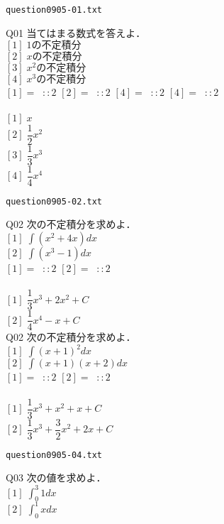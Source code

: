 \documentclass[10pt,dvipdfmx]{ujarticle}
\begin{document}
\begin{center}
\verb|question0905-01.txt|\\
\end{center}
Q01 
$\text{当てはまる数式を答えよ．}$\\
$[1]\;1\text{の不定積分}$\\
$[2]\;x\text{の不定積分}$\\
$[3]\;x^2\text{の不定積分}$\\
$[4]\;x^3\text{の不定積分}$\\
$[1]=\;\;::2$ 
$[2]=\;\;::2$ 
$[4]=\;\;::2$ 
$[4]=\;\;::2$ 
\\
\\
$[1]\;x$\\
$[2]\;\dfrac{1}{2}x^2$\\
$[3]\;\dfrac{1}{3}x^3$\\
$[4]\;\dfrac{1}{4}x^4$\\
\newpage
\begin{center}
\verb|question0905-02.txt|\\
\end{center}
Q02 
$\text{次の不定積分を求めよ．}$\\
$[1]\;\displaystyle\int (x^2+4x) dx $\\
$[2]\;\displaystyle\int (x^3-1) dx $\\
$[1]=\;\;::2$ 
$[2]=\;\;::2$ 
\\
\\
$[1]\;\dfrac{1}{3}x^3+2x^2+C$\\
$[2]\;\dfrac{1}{4}x^4-x+C$\\
Q02 
$\text{次の不定積分を求めよ．}$\\
$[1]\;\displaystyle\int (x+1)^2 dx $\\
$[2]\;\displaystyle\int (x+1)(x+2) dx $\\
$[1]=\;\;::2$ 
$[2]=\;\;::2$ 
\\
\\
$[1]\;\dfrac{1}{3}x^3+x^2+x+C$\\
$[2]\;\dfrac{1}{3}x^3+\dfrac{3}{2}x^2+2x+C$\\
\newpage
\begin{center}
\verb|question0905-04.txt|\\
\end{center}
Q03 
$\text{次の値を求めよ．}$\\
$[1]\;\displaystyle\int_{0}^{3} 1 dx $\\
$[2]\;\displaystyle\int_{0}^{1} x dx $\\
\end{document}
